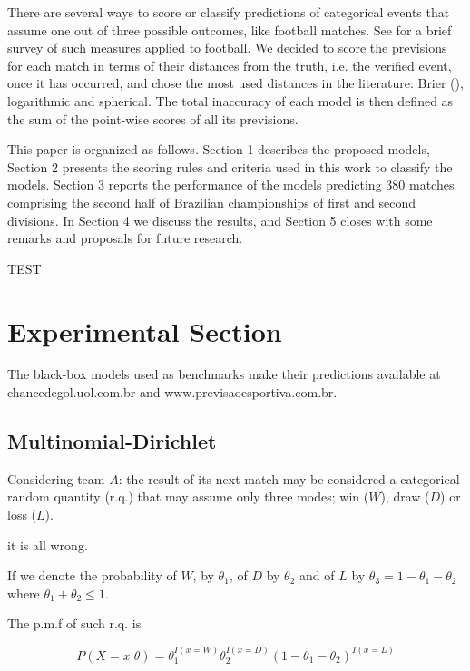 \documentclass[journal,article,accept,moreauthors,pdftex,12pt,a4paper]{mdpi}
\begin{document}
There are several ways to score or classify predictions of categorical events that assume one out of three possible outcomes, like football matches.
See \cite{constantinou} for a brief survey of such measures applied to football.
We decided to score the previsions for each match in terms of their distances from the truth, i.e. the verified event, once it has occurred, and chose the most used distances in the literature: Brier (\cite{brier1950}), logarithmic and spherical.
The total inaccuracy of each model is then defined as the sum of the point-wise scores of all its previsions.

This paper is organized as follows.
Section 1 describes the proposed models, Section 2 presents the scoring rules and criteria used in this work to classify the models.
Section 3 reports the performance of the models predicting 380 matches comprising the second half of Brazilian championships of first and second divisions.
In Section 4 we discuss the results, and Section 5 closes with some remarks and proposals for future research.


TEST



\section{Experimental Section}

The black-box models used as benchmarks make their predictions available at {chancedegol.uol.com.br} and {www.previsaoesportiva.com.br}.


\subsection{Multinomial-Dirichlet}

Considering team $A$: the result of its next match may be considered a categorical random quantity (r.q.) that may assume only three modes; win ($W$), draw ($D$) or loss ($L$).

it is all wrong.

If we denote the probability of $W$, by $\theta_1$, of $D$ by $\theta_2$ and of $L$ by $\theta_3=1-\theta_1-\theta_2$ where $\theta_1+\theta_2\leq 1$.

The p.m.f of such r.q. is

\[
P(X=x|\theta)=\theta_1^{I(x=W)}\theta_2^{I(x=D)}(1-\theta_1-\theta_2)^{I(x=L)}
\]
\end{document}
